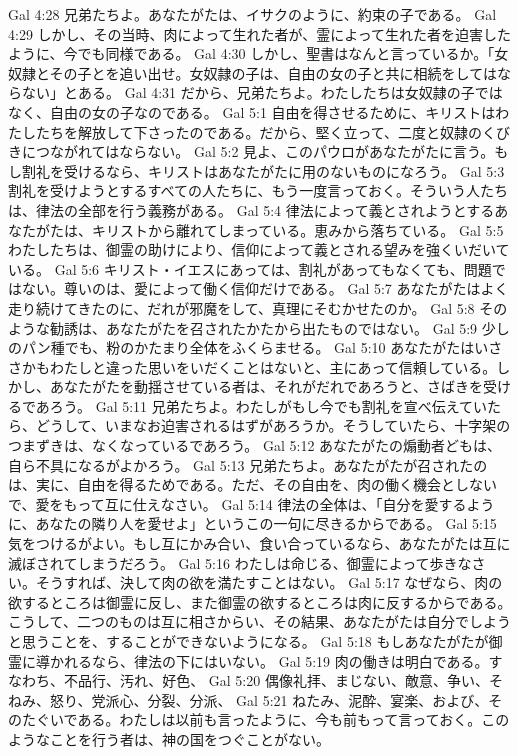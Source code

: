 Gal 4:28  兄弟たちよ。あなたがたは、イサクのように、約束の子である。
Gal 4:29  しかし、その当時、肉によって生れた者が、霊によって生れた者を迫害したように、今でも同様である。
Gal 4:30  しかし、聖書はなんと言っているか。「女奴隷とその子とを追い出せ。女奴隷の子は、自由の女の子と共に相続をしてはならない」とある。
Gal 4:31  だから、兄弟たちよ。わたしたちは女奴隷の子ではなく、自由の女の子なのである。
Gal 5:1  自由を得させるために、キリストはわたしたちを解放して下さったのである。だから、堅く立って、二度と奴隷のくびきにつながれてはならない。
Gal 5:2  見よ、このパウロがあなたがたに言う。もし割礼を受けるなら、キリストはあなたがたに用のないものになろう。
Gal 5:3  割礼を受けようとするすべての人たちに、もう一度言っておく。そういう人たちは、律法の全部を行う義務がある。
Gal 5:4  律法によって義とされようとするあなたがたは、キリストから離れてしまっている。恵みから落ちている。
Gal 5:5  わたしたちは、御霊の助けにより、信仰によって義とされる望みを強くいだいている。
Gal 5:6  キリスト・イエスにあっては、割礼があってもなくても、問題ではない。尊いのは、愛によって働く信仰だけである。
Gal 5:7  あなたがたはよく走り続けてきたのに、だれが邪魔をして、真理にそむかせたのか。
Gal 5:8  そのような勧誘は、あなたがたを召されたかたから出たものではない。
Gal 5:9  少しのパン種でも、粉のかたまり全体をふくらませる。
Gal 5:10  あなたがたはいささかもわたしと違った思いをいだくことはないと、主にあって信頼している。しかし、あなたがたを動揺させている者は、それがだれであろうと、さばきを受けるであろう。
Gal 5:11  兄弟たちよ。わたしがもし今でも割礼を宣べ伝えていたら、どうして、いまなお迫害されるはずがあろうか。そうしていたら、十字架のつまずきは、なくなっているであろう。
Gal 5:12  あなたがたの煽動者どもは、自ら不具になるがよかろう。
Gal 5:13  兄弟たちよ。あなたがたが召されたのは、実に、自由を得るためである。ただ、その自由を、肉の働く機会としないで、愛をもって互に仕えなさい。
Gal 5:14  律法の全体は、「自分を愛するように、あなたの隣り人を愛せよ」というこの一句に尽きるからである。
Gal 5:15  気をつけるがよい。もし互にかみ合い、食い合っているなら、あなたがたは互に滅ぼされてしまうだろう。
Gal 5:16  わたしは命じる、御霊によって歩きなさい。そうすれば、決して肉の欲を満たすことはない。
Gal 5:17  なぜなら、肉の欲するところは御霊に反し、また御霊の欲するところは肉に反するからである。こうして、二つのものは互に相さからい、その結果、あなたがたは自分でしようと思うことを、することができないようになる。
Gal 5:18  もしあなたがたが御霊に導かれるなら、律法の下にはいない。
Gal 5:19  肉の働きは明白である。すなわち、不品行、汚れ、好色、
Gal 5:20  偶像礼拝、まじない、敵意、争い、そねみ、怒り、党派心、分裂、分派、
Gal 5:21  ねたみ、泥酔、宴楽、および、そのたぐいである。わたしは以前も言ったように、今も前もって言っておく。このようなことを行う者は、神の国をつぐことがない。

